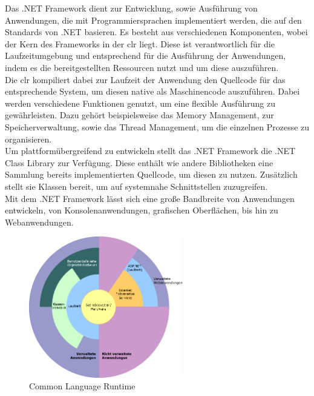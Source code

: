 Das .NET Framework dient zur Entwicklung, sowie Ausführung von Anwendungen, die mit Programmiersprachen implementiert werden, die auf den Standards von .NET basieren. Es besteht aus verschiedenen Komponenten, wobei der Kern des Frameworks in der \gls{clr} liegt. Diese ist verantwortlich für die Laufzeitumgebung und entsprechend für die Ausführung der Anwendungen, indem es die bereitgestellten Ressourcen nutzt und um diese auszuführen.\\
Die \gls{clr} kompiliert dabei zur Laufzeit der Anwendung den Quellcode für das entsprechende System, um diesen native als Maschinencode auszuführen. Dabei werden verschiedene Funktionen genutzt, um eine flexible Ausführung zu gewährleisten. Dazu gehört beispielsweise das Memory Management, zur Speicherverwaltung, sowie das Thread Management, um die einzelnen Prozesse zu organisieren.\\
Um plattformübergreifend zu entwickeln stellt das .NET Framework die .NET Class Library zur Verfügung. Diese enthält wie andere Bibliotheken eine Sammlung bereits implementierten Quellcode, um diesen zu nutzen. Zusätzlich stellt sie Klassen bereit, um auf systemnahe Schnittstellen zuzugreifen.\\
Mit dem .NET Framework lässt sich eine große Bandbreite von Anwendungen entwickeln, von Konsolenanwendungen, grafischen Oberflächen, bis hin zu Webanwendungen.

\begin{figure}[h]
	\centering
	\includegraphics[width=0.6\textwidth]{images/technische_grundlagen/clr.png}
	\caption{Common Language Runtime}
	\label{fig:clr}
\end{figure}

